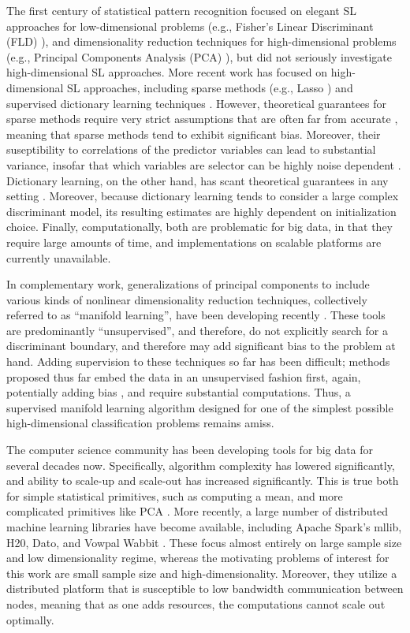 \documentclass[10pt]{article}
\begin{document}
The first century of statistical pattern recognition focused on elegant SL approaches for low-dimensional problems (e.g., Fisher's Linear Discriminant (FLD) \cite{Fisher}), and dimensionality reduction techniques for high-dimensional problems (e.g., Principal Components Analysis (PCA) \cite{PCA}), but did not seriously investigate high-dimensional SL approaches.  More recent work has focused on high-dimensional SL approaches, including sparse methods (e.g., Lasso \cite{Lasso}) and supervised dictionary learning techniques \cite{Mairal2009}.  However, theoretical guarantees for sparse methods require very strict assumptions that are often far from accurate \cite{??}, meaning that sparse methods tend to exhibit significant bias.  Moreover, their suseptibility to correlations of the predictor variables can lead to substantial variance, insofar that which variables are selector can be highly noise dependent \cite{Meinshausen2010c}.  Dictionary learning, on the other hand, has scant theoretical guarantees in any setting \cite{??}.  Moreover, because dictionary learning tends to consider a large complex discriminant model, its resulting estimates are highly dependent on initialization choice.  Finally, computationally, both are problematic for big data, in that they require large amounts of time, and implementations on scalable platforms are currently unavailable.

In complementary work, generalizations of principal components to include various kinds of nonlinear dimensionality reduction techniques, collectively referred to as  ``manifold learning'', have been developing recently \cite{??}. These tools are predominantly ``unsupervised'', and therefore, do not explicitly search for a discriminant boundary, and therefore may add significant bias to the problem at hand.  Adding supervision to these techniques so far has been difficult; methods proposed thus far embed the data in an unsupervised fashion first, again, potentially adding bias \cite{Belkin2004a}, and require substantial computations.   Thus, a supervised manifold learning algorithm designed for one of the simplest possible high-dimensional classification problems remains amiss.


The computer science community has been developing tools for big data for several decades now. Specifically, algorithm complexity has lowered significantly, and ability to scale-up and scale-out has increased significantly.  This is true both for simple statistical primitives, such as computing a mean, and more complicated primitives like PCA \cite{??}.  More recently, a large number of distributed machine learning libraries have become available, including Apache Spark's mllib,  H20, Dato, and Vowpal Wabbit \cite{??}.  These focus almost entirely on large sample size and low dimensionality regime, whereas the motivating problems of interest for this work are small sample size and high-dimensionality. Moreover, they utilize a distributed platform that is susceptible to low bandwidth communication between nodes, meaning that as one adds resources, the computations cannot scale out optimally.
\end{document}
